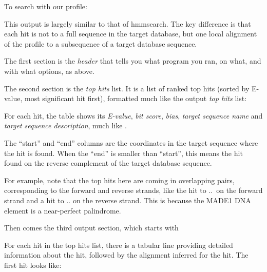 To search  with our  profile:

   \vspace{1ex}
   \vspace{1ex}

This output is largely similar to that of hmmsearch. The key
difference is that each hit is not to a full sequence in the target
database, but one local alignment of the profile to a subsequence of a
target database sequence.

The first section is the \emph{header} that tells you what program you
ran, on what, and with what options, as above.

The second section is the \emph{top hits} list. It is a list
of ranked top hits (sorted by E-value, most significant hit first),
formatted much like the  output \emph{top hits} list:


For each hit, the table shows its \emph{E-value}, \emph{bit score},
\emph{bias}, \emph{target sequence name} and \emph{target sequence
  description}, much like .

The ``start'' and ``end'' columns are the coordinates in the target
sequence where the hit is found. When the ``end'' is smaller than
``start'', this means the hit found on the reverse complement of the
target database sequence.

For example, note that the top hits here are coming in overlapping
pairs, corresponding to the forward and reverse strands, like the hit
to \NMHafrom{}..\NMHato\ on the forward strand and a hit to
\NMHbfrom{}..\NMHbto{} on the reverse strand. This is because the
MADE1 DNA element is a near-perfect palindrome.

Then comes the third output section, which starts with


For each hit in the top hits list, there is a tabular line
providing detailed information about the hit, followed by the alignment
inferred for the hit. The first  hit
looks like: 

